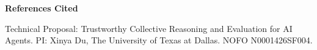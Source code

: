 \documentclass[12pt,letterpaper]{article}
\begin{document}
{\large\bfseries References Cited\par}
\vspace{2pt}
{\small Technical Proposal: Trustworthy Collective Reasoning and Evaluation for AI Agents.
PI: Xinya Du, The University of Texas at Dallas. NOFO N0001426SF004.\par}
\vspace{4pt}
\begingroup
\small
\setlength{\bibsep}{2.5pt}

\endgroup
\end{document}
